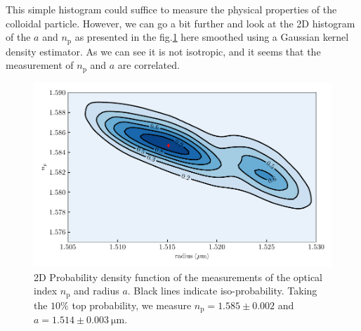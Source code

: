 This simple histogram could suffice to measure the physical properties of the colloidal particle. However, we can go a bit further and look at the 2D histogram of the $a$ and $n_\mathrm{p}$ as presented in the fig.\ref{fig:KDErn} here smoothed using a Gaussian kernel density estimator. As we can see it is not isotropic, and it seems that the measurement of $n_\mathrm{p}$ and $a$ are correlated.
 

\begin{figure}[!ht]
	\centering
	\includegraphics{02_body/chapter2/images/KDErn.pdf}
	\caption{2D Probability density function of the measurements of the optical index $n_\mathrm{p}$ and radius $a$. Black lines indicate iso-probability. Taking the $10\% $ top probability, we measure $n_\mathrm{p} = 1.585 \pm 0.002$ and $a=1.514 \pm 0.003 ~ \mathrm{\mu m}$. }
	\label{fig:KDErn}
\end{figure}